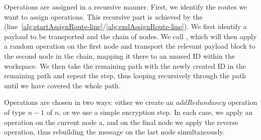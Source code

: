 Operations are assigned in a recursive manner. First, we identify the routes we want to assign operations. This recursive part is achieved by the  (line~\ref{alg:startAssignRoute-line}\-/\ref{alg:endAssignRoute-line}). We first identify a payload to be transported and the chain of nodes. We call , which will then apply a random operation on the first node and transport the relevant payload block to the second node in the chain, mapping it there to an unused ID within the workspace. We then take the remaining path with the newly created ID in the remaining path and repeat the step, thus looping recursively through the path until we have covered the whole path.

Operations are chosen in two ways: either we create an $addRedundancy$ operation of type $n-1$ of $n$, or we use a simple encryption step. In each case, we apply an operation on the current node a, and on the final node we apply the reverse operation, thus rebuilding the message on the last node simultaneously.

